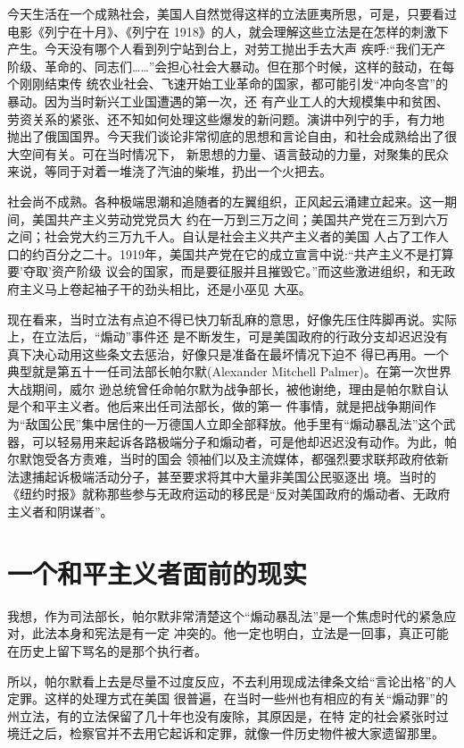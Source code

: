 \documentclass[10pt]{article}
\begin{document}
{今天生活在一个成熟社会，美国人自然觉得这样的立法匪夷所思，可是，只要看过电影《列宁在十月》、《列宁在
1918》的人，就会理解这些立法是在怎样的刺激下产生。今天没有哪个人看到列宁站到台上，对劳工抛出手去大声
疾呼:``我们无产阶级、革命的、同志们……''会担心社会大暴动。但在那个时候，这样的鼓动，在每个刚刚结束传
统农业社会、飞速开始工业革命的国家，都可能引发``冲向冬宫''的暴动。因为当时新兴工业国遭遇的第一次，还
有产业工人的大规模集中和贫困、劳资关系的紧张、还不知如何处理这些爆发的新问题。演讲中列宁的手，有力地
抛出了俄国国界。今天我们谈论非常彻底的思想和言论自由，和社会成熟给出了很大空间有关。可在当时情况下，
新思想的力量、语言鼓动的力量，对聚集的民众来说，等同于对着一堆浇了汽油的柴堆，扔出一个火把去。

社会尚不成熟。各种极端思潮和追随者的左翼组织，正风起云涌建立起来。这一期间，美国共产主义劳动党党员大
约在一万到三万之间；美国共产党在三万到六万之间；社会党大约三万九千人。自认是社会主义共产主义者的美国
人占了工作人口的约百分之二十。1919年，美国共产党在它的成立宣言中说:``共产主义不是打算要'夺取'资产阶级
议会的国家，而是要征服并且摧毁它。''而这些激进组织，和无政府主义马上卷起袖子干的劲头相比，还是小巫见
大巫。

现在看来，当时立法有点迫不得已快刀斩乱麻的意思，好像先压住阵脚再说。实际上，在立法后，``煽动''事件还
是不断发生，可是美国政府的行政分支却迟迟没有真下决心动用这些条文去惩治，好像只是准备在最坏情况下迫不
得已再用。一个典型就是第五十一任司法部长帕尔默(Alexander Mitchell Palmer)。在第一次世界大战期间，威尔
逊总统曾任命帕尔默为战争部长，被他谢绝，理由是帕尔默自认是个和平主义者。他后来出任司法部长，做的第一
件事情，就是把战争期间作为``敌国公民''集中居住的一万德国人立即全部释放。他手里有``煽动暴乱法''这个武
器，可以轻易用来起诉各路极端分子和煽动者，可是他却迟迟没有动作。为此，帕尔默饱受各方责难，当时的国会
领袖们以及主流媒体，都强烈要求联邦政府依新法逮捕起诉极端活动分子，甚至要求将其中大量非美国公民驱逐出
境。当时的《纽约时报》就称那些参与无政府运动的移民是``反对美国政府的煽动者、无政府主义者和阴谋者''。

\pagebreak
\section{一个和平主义者面前的现实}

我想，作为司法部长，帕尔默非常清楚这个``煽动暴乱法''是一个焦虑时代的紧急应对，此法本身和宪法是有一定
冲突的。他一定也明白，立法是一回事，真正可能在历史上留下骂名的是那个执行者。

所以，帕尔默看上去是尽量不过度反应，不去利用现成法律条文给``言论出格''的人定罪。这样的处理方式在美国
很普遍，在当时一些州也有相应的有关``煽动罪''的州立法，有的立法保留了几十年也没有废除，其原因是，在特
定的社会紧张时过境迁之后，检察官并不去用它起诉和定罪，就像一件历史物件被大家遗留那里。

}
\end{document}
